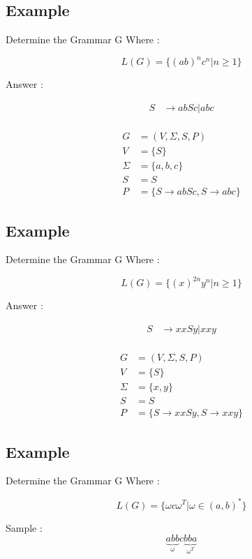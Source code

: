 \documentclass[12pt]{book}
\begin{document}
\subsection{Example}

Determine the Grammar G Where :

$$
L(G) = \{ (ab)^{n} c ^{n} | n \geq 1 \}
$$

Answer :

\begin{align*}
 S &\to abSc | abc \\
\end{align*}


\begin{align*}
G &= (V, \Sigma, S, P) \\
V &= \{ S \} \\
\Sigma &= \{ a, b, c \} \\
S &= S \\
P &= \{ S \to abSc ,
S \to abc  \}
\end{align*}


\subsection{Example}

Determine the Grammar G Where :

$$
L(G) = \{ (x)^{2n} y ^{n} | n \geq 1 \}
$$

Answer :

\begin{align*}
 S &\to xxSy | xxy \\
\end{align*}


\begin{align*}
G &= (V, \Sigma, S, P) \\
V &= \{ S \} \\
\Sigma &= \{ x, y \} \\
S &= S \\
P &= \{ S \to xxSy ,
S \to xxy  \}
\end{align*}



\subsection{Example}

Determine the Grammar G Where :

$$
L(G) = \{ \omega c \omega^{T} | \omega \in (a,b)^{*} \}
$$

Sample : 
$$
\underbrace{abb}_{\omega}c\underbrace{bba}_{\omega^{T}}
$$
\end{document}
